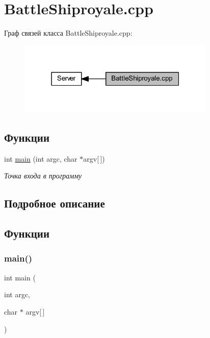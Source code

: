 \hypertarget{group__battleshiproyalecpp}{}\section{Battle\+Shiproyale.\+cpp}
\label{group__battleshiproyalecpp}
Граф связей класса Battle\+Shiproyale.\+cpp\+:
\nopagebreak
\begin{figure}[H]
\begin{center}
\leavevmode
\includegraphics[width=267pt]{group__battleshiproyalecpp}
\end{center}
\end{figure}
\subsection*{Функции}
\begin{DoxyCompactItemize}
\item 
int \mbox{\hyperlink{group__battleshiproyalecpp_ga0ddf1224851353fc92bfbff6f499fa97}{main}} (int argc, char $\ast$argv\mbox{[}$\,$\mbox{]})
\begin{DoxyCompactList}\small\item\em Точка входа в программу \end{DoxyCompactList}\end{DoxyCompactItemize}


\subsection{Подробное описание}


\subsection{Функции}
\mbox{\label{group__battleshiproyalecpp_ga0ddf1224851353fc92bfbff6f499fa97}} 
\subsubsection{\texorpdfstring{main()}{main()}}
{\footnotesize\ttfamily int main (\begin{DoxyParamCaption}\item[{int}]{argc,  }\item[{char $\ast$}]{argv\mbox{[}$\,$\mbox{]} }\end{DoxyParamCaption})}



